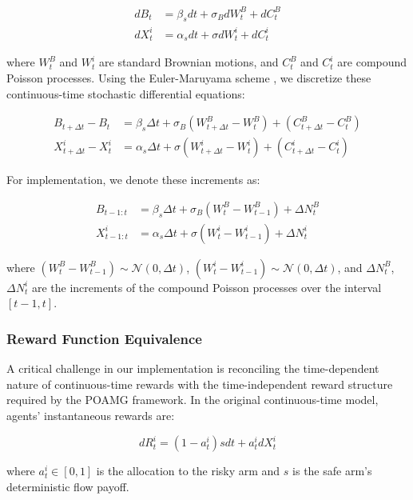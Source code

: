 \begin{align}
    dB_t &= \beta_s dt + \sigma_B dW^B_t + dC^B_t \\
    dX^i_t &= \alpha_s dt + \sigma dW^i_t + dC^i_t
\end{align}

where $W^B_t$ and $W^i_t$ are standard Brownian motions, and $C^B_t$ and $C^i_t$ are compound Poisson processes. Using the Euler-Maruyama scheme \citep{higham2001algorithmic, kloeden1992numerical}, we discretize these continuous-time stochastic differential equations:

\begin{align}
    B_{t+\Delta t} - B_t &= \beta_s \Delta t + \sigma_B (W^B_{t+\Delta t} - W^B_t) + (C^B_{t+\Delta t} - C^B_t) \\
    X^i_{t+\Delta t} - X^i_t &= \alpha_s \Delta t + \sigma (W^i_{t+\Delta t} - W^i_t) + (C^i_{t+\Delta t} - C^i_t)
\end{align}

For implementation, we denote these increments as:

\begin{align}
    B_{t-1:t} &= \beta_s \Delta t + \sigma_B (W^B_t - W^B_{t-1}) + \Delta N^B_t \\
    X^i_{t-1:t} &= \alpha_s \Delta t + \sigma (W^i_t - W^i_{t-1}) + \Delta N^i_t
\end{align}

where $(W^B_t - W^B_{t-1}) \sim \mathcal{N}(0, \Delta t)$, $(W^i_t - W^i_{t-1}) \sim \mathcal{N}(0, \Delta t)$, and $\Delta N^B_t$, $\Delta N^i_t$ are the increments of the compound Poisson processes over the interval $[t-1, t]$.

\subsubsection{Reward Function Equivalence}
\label{appendix:reward_equivalence}

A critical challenge in our implementation is reconciling the time-dependent nature of continuous-time rewards with the time-independent reward structure required by the POAMG framework. In the original continuous-time model, agents' instantaneous rewards are:

\begin{equation}
    dR^i_t = (1-a^i_t)s dt + a^i_t dX^i_t
\end{equation}

where $a^i_t \in [0,1]$ is the allocation to the risky arm and $s$ is the safe arm's deterministic flow payoff.


